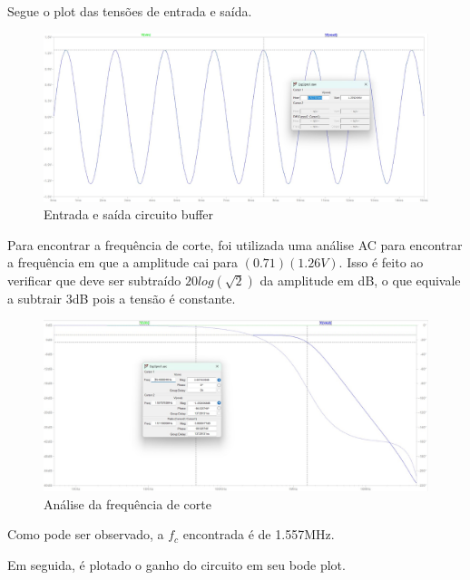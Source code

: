 \documentclass[10pt,twocolumn,letterpaper]{article}
\begin{document}
Segue o plot das tensões de entrada e saída.

\begin{figure}[h]
\caption{Entrada e saída circuito buffer}
\begin{center}
\includegraphics[scale=0.15]{figuras/fig2}
\end{center}
\end{figure}

Para encontrar a frequência de corte, foi utilizada uma análise AC para encontrar a frequência em que a amplitude cai para $(0.71)(1.26V)$.	Isso é feito ao verificar que deve ser subtraído  $20log(\sqrt{2})$ da amplitude em dB, o que equivale a subtrair 3dB pois a tensão é constante.

\begin{figure}[h]
\caption{Análise da frequência de corte}
\begin{center}
\includegraphics[scale=0.15]{figuras/fig3}
\end{center}
\end{figure}

Como pode ser observado, a $f_c$ encontrada é de 1.557MHz.

Em seguida, é plotado o ganho do circuito em seu bode plot.
\end{document}
